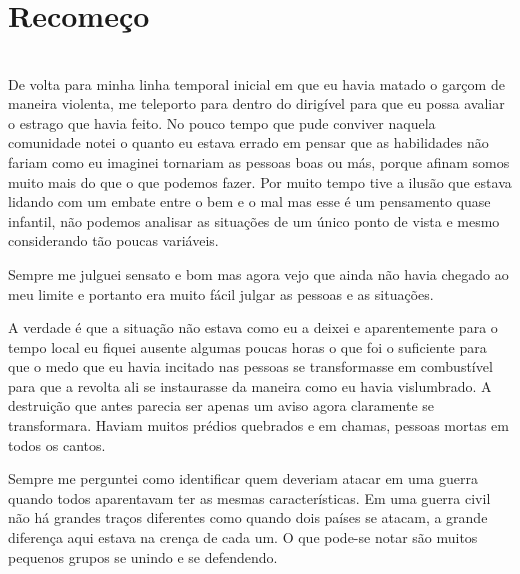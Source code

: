


\newpage


\ifdefined\useChapters
\chapter{Recomeço}

\else
\chapter{}
\fi

De volta para minha linha temporal  inicial em que eu havia matado o garçom de maneira violenta, me teleporto para dentro do dirigível para que eu possa avaliar o estrago que havia feito. No pouco tempo que pude conviver naquela comunidade notei o quanto eu estava errado em pensar que as habilidades não fariam como eu imaginei tornariam as pessoas boas ou más, porque afinam somos muito mais do que o que podemos fazer. Por muito tempo tive a ilusão que estava lidando com um embate entre o bem e o mal mas esse é um pensamento quase infantil, não podemos analisar as situações de um único ponto de vista e mesmo considerando tão poucas variáveis.

Sempre me julguei sensato e bom mas agora vejo que ainda não havia chegado ao meu limite e portanto era muito fácil julgar as pessoas e as situações. 

A verdade é que a situação não estava como eu a deixei e aparentemente para o tempo local eu fiquei ausente algumas poucas horas o que foi o suficiente para que o medo que eu havia incitado nas pessoas se transformasse em combustível para que a revolta ali se instaurasse da maneira como eu havia vislumbrado. A destruição que antes parecia ser apenas um aviso agora claramente se transformara.  Haviam muitos prédios quebrados e em chamas, pessoas mortas em todos os cantos.

Sempre me perguntei como identificar quem deveriam atacar em uma guerra quando todos aparentavam ter as mesmas características. Em uma guerra civil não há grandes traços diferentes como quando dois países se atacam, a grande diferença aqui estava na crença de cada um. O que pode-se notar são muitos pequenos grupos se unindo e se defendendo.


